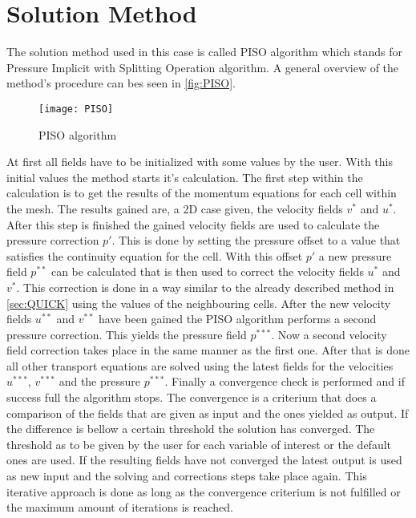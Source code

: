 \documentclass[../thesis.tex]{subfiles}
\begin{document}
\section{Solution Method}

The solution method used in this case is called PISO algorithm which stands for Pressure Implicit with Splitting Operation algorithm. A general overview of the method's procedure can bes seen in \autoref{fig:PISO}.

\begin{figure}[htbp]
	\centering
	\texttt{[image: PISO]}
	\caption{PISO algorithm}
	\label{fig:PISO}
\end{figure}

At first all fields have to be initialized with some values by the user. With this initial values the method starts it's calculation. The first step within the calculation is to get the results of the momentum equations for each cell within the mesh. The results gained are, a 2D case given, the velocity fields $v^*$ and $u^*$. After this step is finished the gained velocity fields are used to calculate the pressure correction $p'$. This is done by setting the pressure offset to a value that satisfies the continuity equation for the cell. With this offset $p'$ a new pressure field $p^{**}$ can be calculated that is then used to correct the velocity fields $u^*$ and $v^*$. This correction is done in a way similar to the already described method in \autoref{sec:QUICK} using the values of the neighbouring cells. After the new velocity fields $u^{**}$ and $v^{**}$ have been gained the PISO algorithm performs a second pressure correction. This yields the pressure field $p^{***}$. Now a second velocity field correction takes place in the same manner as the first one. After that is done all other transport equations are solved using the latest fields for the velocities $u^{***}$, $v^{***}$ and the pressure $p^{***}$. Finally a convergence check is performed and if success full the algorithm stops. The convergence is a criterium that does a comparison of the fields that are given as input and the ones yielded as output. If the difference is bellow a certain threshold the solution has converged. The threshold as to be given by the user for each variable of interest or the default ones are used. If the resulting fields have not converged the latest output is used as new input and the solving and corrections steps take place again. This iterative approach is done as long as the convergence criterium is not fulfilled or the maximum amount of iterations is reached.
\end{document}
